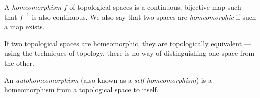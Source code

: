\documentclass{article}
\begin{document}
A \emph{homeomorphism} $f$ of topological spaces is a continuous, bijective map such that $f^{-1}$ is also continuous. We also say that two spaces are \emph{homeomorphic} if such a map exists.

If two topological spaces are homeomorphic, they are topologically equivalent --- using the techniques of topology, there is no way of distinguishing one space from the other.

An \emph{autohomeomorphism} (also known as a \emph{self-homeomorphism}) is a 
homeomorphism from a topological space to itself.
\end{document}
